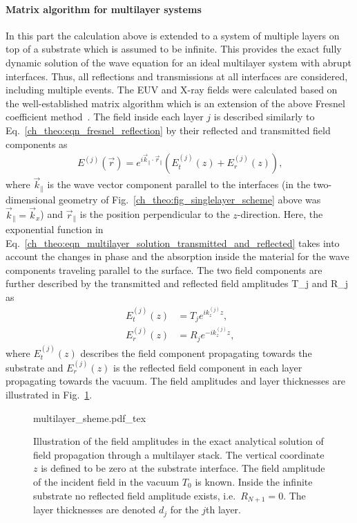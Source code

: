 \paragraph{Matrix algorithm for multilayer systems} \label{ch_theo:sec_matrix_algorithm}
In this part the calculation above is extended to a system of multiple layers on top of a substrate which is assumed to be infinite. This provides the exact fully dynamic solution of the wave equation for an ideal multilayer system with abrupt interfaces. Thus, all reflections and transmissions at all interfaces are considered, including multiple events. The EUV and X-ray fields were calculated based on the well-established matrix algorithm which is an extension of the above Fresnel coefficient method~\cite{born_principles_1965,mikulik_x-ray_1997}. The field inside each layer $j$ is described similarly to Eq.~\eqref{ch_theo:eqn_fresnel_reflection} by their reflected and transmitted field components as
\begin{align}
E^{(j)}(\vec{r}) = e^{i \vec{k}_\parallel \cdot \vec{r}_\parallel} (E_t^{(j)}(z) + E_r^{(j)}(z)) \text{,} \label{ch_theo:eqn_multilayer_solution_transmitted_and_reflected}
\end{align}
where $\vec{k}_\parallel$ is the wave vector component parallel to the interfaces (in the two-dimensional geometry of Fig.~\ref{ch_theo:fig_singlelayer_scheme} above was $\vec{k}_\parallel = \vec{k}_x$) and $\vec{r}_\parallel$ is the position perpendicular to the $z$-direction. Here, the exponential function in Eq.~\eqref{ch_theo:eqn_multilayer_solution_transmitted_and_reflected} takes into account the changes in phase and the absorption inside the material for the wave components traveling parallel to the surface. The two field components are further described by the transmitted and reflected field amplitudes \gls{T_j} and \gls{R_j} as
\begin{align}
E_t^{(j)}(z) &= T_{j} e^{i k_z^{(j)} z} \text{,} \label{ch_theo:eqn_multilayer_amplitude_transmitted} \\
E_r^{(j)}(z) &= R_{j} e^{-i k_z^{(j)} z} \text{,} \label{ch_theo:eqn_multilayer_amplitude_reflected}
\end{align}
where $E_t^{(j)}(z)$ describes the field component propagating towards the substrate and $E_r^{(j)}(z)$ is the reflected field component in each layer propagating towards the vacuum. The field amplitudes and layer thicknesses are illustrated in Fig.~\ref{ch_theo:fig_multilayer_scheme}.
\begin{figure}[htb]
    {multilayer_sheme.pdf_tex}
    \caption[Field amplitudes in the exact solution for a multilayer system.]{Illustration of the field amplitudes in the exact analytical solution of field propagation through a multilayer stack. The vertical coordinate $z$ is defined to be zero at the substrate interface. The field amplitude of the incident field in the vacuum $T_0$ is known. Inside the infinite substrate no reflected field amplitude exists, i.e.~$R_{N+1} = 0$. The layer thicknesses are denoted $d_j$ for the $j$th layer.}
    \label{ch_theo:fig_multilayer_scheme}
\end{figure}
